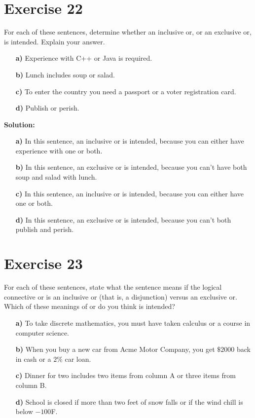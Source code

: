 \documentclass{Axon}
\begin{document}
\section*{Exercise 22}
For each of these sentences, determine whether an inclusive or, or an exclusive or, is intended. Explain your answer.
\begin{enumerate}
    \item[\textbf{a)}] Experience with C++ or Java is required.
    \item[\textbf{b)}] Lunch includes soup or salad.
    \item[\textbf{c)}] To enter the country you need a passport or a voter registration card.
    \item[\textbf{d)}] Publish or perish.
\end{enumerate}

\noindent
\textbf{Solution:}
\begin{enumerate}
    \item[\textbf{a)}] In this sentence, an inclusive or is intended, because you can either have experience with one or both.
    \item[\textbf{b)}] In this sentence, an exclusive or is intended, because you can't have both soup and salad with lunch.
    \item[\textbf{c)}] In this sentence, an inclusive or is intended, because you can either have one or both.
    \item[\textbf{d)}] In this sentence, an exclusive or is intended, because you can't both publish and perish. 
\end{enumerate}

\section*{Exercise 23}
For each of these sentences, state what the sentence means if the logical connective or is an inclusive or (that is, a disjunction) versus an exclusive or. Which of these meanings of or do you think is intended?
\begin{enumerate}
    \item[\textbf{a)}] To take discrete mathematics, you must have taken calculus or a course in computer science.
    \item[\textbf{b)}] When you buy a new car from Acme Motor Company, you get \(\$2000\) back in cash or a \(2\%\) car loan.
    \item[\textbf{c)}] Dinner for two includes two items from column A or three items from column B.
    \item[\textbf{d)}] School is closed if more than two feet of snow falls or if the wind chill is below \(-100\)\textdegree F.
\end{enumerate}
\end{document}
